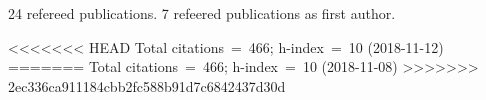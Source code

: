 24 refereed publications. 7 refeered publications as first author.

<<<<<<< HEAD
Total citations~=~466; h-index~=~10 (2018-11-12)
=======
Total citations~=~466; h-index~=~10 (2018-11-08)
>>>>>>> 2ec336ca911184cbb2fc588b91d7c6842437d30d

